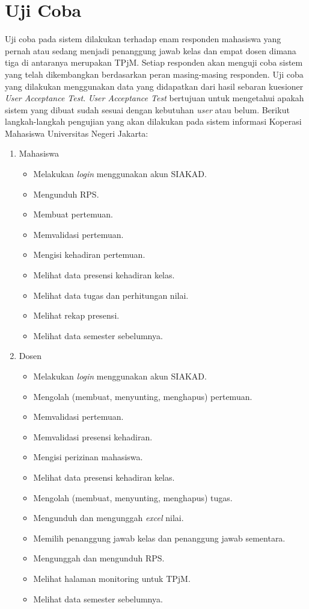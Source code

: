 \section{Uji Coba}
	Uji coba pada sistem dilakukan terhadap enam responden mahasiswa yang pernah atau sedang menjadi penanggung jawab kelas dan empat dosen dimana tiga di antaranya merupakan TPjM. Setiap responden akan menguji coba sistem yang telah dikembangkan berdasarkan peran masing-masing responden. Uji coba yang dilakukan menggunakan data yang didapatkan dari hasil sebaran kuesioner \textit{User Acceptance Test}. \textit{User Acceptance Test} bertujuan untuk mengetahui apakah sistem yang dibuat sudah sesuai dengan kebutuhan \textit{user} atau belum. Berikut langkah-langkah pengujian yang akan dilakukan pada sistem informasi Koperasi Mahasiswa Universitas Negeri Jakarta:
\begin{enumerate}
	\item Mahasiswa
	\begin{itemize}
		\item Melakukan \textit{login} menggunakan akun SIAKAD.
		\item Mengunduh RPS.
		\item Membuat pertemuan.
		\item Memvalidasi pertemuan.
		\item Mengisi kehadiran pertemuan.
		\item Melihat data presensi kehadiran kelas.
		\item Melihat data tugas dan perhitungan nilai.
		\item Melihat rekap presensi.
		\item Melihat data semester sebelumnya.
	\end{itemize}
	\item Dosen
	\begin{itemize}
		\item Melakukan \textit{login} menggunakan akun SIAKAD.
		\item Mengolah (membuat, menyunting, menghapus) pertemuan.
		\item Memvalidasi pertemuan.
		\item Memvalidasi presensi kehadiran.
		\item Mengisi perizinan mahasiswa.
		\item Melihat data presensi kehadiran kelas.
		\item Mengolah (membuat, menyunting, menghapus) tugas.
		\item Mengunduh dan mengunggah \textit{excel} nilai.
		\item Memilih penanggung jawab kelas dan penanggung jawab sementara.
		\item Mengunggah dan mengunduh RPS.
		\item Melihat halaman monitoring untuk TPjM.
		\item Melihat data semester sebelumnya.
	\end{itemize}
\end{enumerate}

